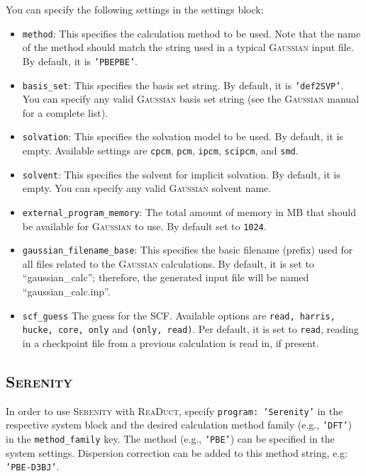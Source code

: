 \documentclass[]{tufte-book}
\begin{document}
You can specify the following settings in the settings block:
\begin{itemize}
\item \texttt{method}:
This specifies the calculation method to be used.
Note that the name of the method should match the string used in a typical \textsc{Gaussian} input file.
By default, it is \texttt{'PBEPBE'}.
\item \texttt{basis\_set}: This specifies the basis set string. By default, it is \texttt{'def2SVP'}. You can specify
any valid \textsc{Gaussian} basis set string (see the \textsc{Gaussian} manual for a complete list).
\item \texttt{solvation}: This specifies the solvation model to be used. By default, it is empty. Available settings are \texttt{cpcm}, \texttt{pcm}, \texttt{ipcm}, \texttt{scipcm},
and \texttt{smd}.
\item \texttt{solvent}: This specifies the solvent for implicit solvation. By default, it is empty. You can specify any valid \textsc{Gaussian} solvent name.
\item \texttt{external\_program\_memory}: The total amount of memory in MB that should be available for \textsc{Gaussian} to use.
By default set to \texttt{1024}.
\item \texttt{gaussian\_filename\_base}: This specifies the basic filename (prefix) used for all files related to the \textsc{Gaussian} calculations.
By default, it is set to ``gaussian\_calc''; therefore, the generated input file will be named ``gaussian\_calc.inp''.
\item \texttt{scf\_guess} The guess for the SCF. Available options are \texttt{read, harris, hucke, core, only} and \texttt{(only, read)}. Per default, it is set to \texttt{read}, reading in a checkpoint file from a previous calculation is read in, if present.
\end{itemize}


\subsection{\textsc{Serenity}}

In order to use \textsc{Serenity} with \textsc{ReaDuct}, specify \texttt{program: 'Serenity'} in the respective system block and the desired
calculation method family (e.g., \texttt{'DFT'}) in the \texttt{method\_family} key.
The method (e.g., \texttt{'PBE'}) can be specified in the system settings. Dispersion correction can be added to this method string, e.g: \texttt{'PBE-D3BJ'}.
\end{document}
